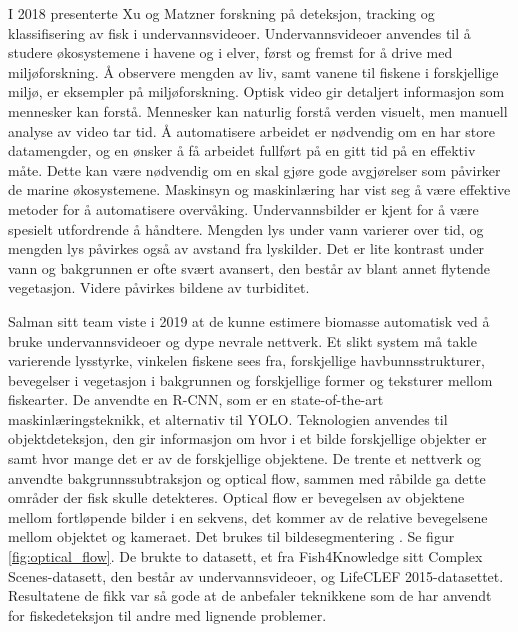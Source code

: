 I 2018 presenterte Xu og Matzner forskning på deteksjon, tracking og klassifisering av fisk i undervannsvideoer. Undervannsvideoer anvendes til å studere økosystemene i havene og i elver, først og fremst for å drive med miljøforskning. Å observere mengden av liv, samt vanene til fiskene i forskjellige miljø, er eksempler på miljøforskning. Optisk video gir detaljert informasjon som mennesker kan forstå. Mennesker kan naturlig forstå verden visuelt, men manuell analyse av video tar tid. Å automatisere arbeidet er nødvendig om en har store datamengder, og en ønsker å få arbeidet fullført på en gitt tid på en effektiv måte. Dette kan være nødvendig om en skal gjøre gode avgjørelser som påvirker de marine økosystemene. Maskinsyn og maskinlæring har vist seg å være effektive metoder for å automatisere overvåking. Undervannsbilder er kjent for å være spesielt utfordrende å håndtere. Mengden lys under vann varierer over tid, og mengden lys påvirkes også av avstand fra lyskilder. Det er lite kontrast under vann og bakgrunnen er ofte svært avansert, den består av blant annet flytende vegetasjon. Videre påvirkes bildene av turbiditet. \cite{Xu og Matzner 2018}


Salman sitt team viste i 2019 at de kunne estimere biomasse automatisk ved å bruke undervannsvideoer og dype nevrale nettverk.  Et slikt system må takle varierende lysstyrke, vinkelen fiskene sees fra, forskjellige havbunnsstrukturer, bevegelser i vegetasjon i bakgrunnen og forskjellige former og teksturer mellom fiskearter. De anvendte en R-CNN, som er en state-of-the-art maskinlæringsteknikk, et alternativ til YOLO. Teknologien anvendes til objektdeteksjon, den gir informasjon om hvor i et bilde forskjellige objekter er samt hvor mange det er av de forskjellige objektene. De trente et nettverk og anvendte bakgrunnssubtraksjon og optical flow, sammen med råbilde ga dette områder der fisk skulle detekteres. Optical flow er bevegelsen av objektene mellom fortløpende bilder i en sekvens, det kommer av de relative bevegelsene mellom objektet og kameraet. Det brukes til bildesegmentering \cite{Lin 2019}. Se figur \ref{fig:optical_flow}. De brukte to datasett, et fra Fish4Knowledge sitt Complex Scenes-datasett, den består av undervannsvideoer, og LifeCLEF 2015-datasettet. Resultatene de fikk var så gode at de anbefaler teknikkene som de har anvendt for fiskedeteksjon til andre med lignende problemer. \cite{Salman m.fl. 2019}

